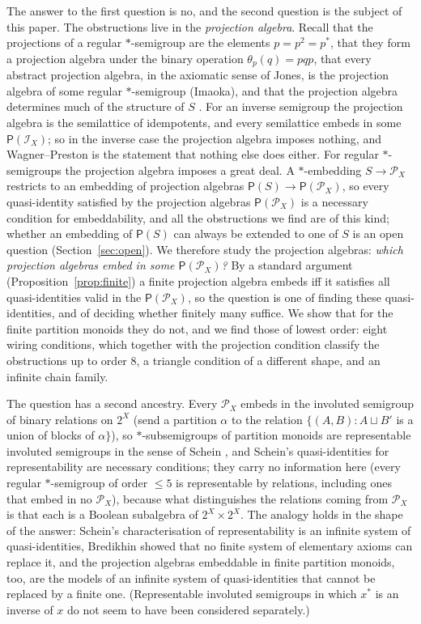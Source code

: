 \documentclass[11pt]{amsart}
\theoremstyle{definition}
\renewcommand{\P}{\mathcal{P}}      %
\newcommand{\PA}{\mathsf{P}}         %
\begin{document}
The answer to the first question is no, and the second question is the subject of this paper. The obstructions live in the \emph{projection algebra}. Recall that the projections of a regular $*$-semigroup are the elements $p=p^2=p^*$, that they form a projection algebra under the binary operation $\theta_p(q)=pqp$, that every abstract projection algebra, in the axiomatic sense of Jones, is the projection algebra of some regular $*$-semigroup (Imaoka), and that the projection algebra determines much of the structure of $S$ \cite{Imaoka80,Imaoka81,Jones,EM,EGMR}. For an inverse semigroup the projection algebra is the semilattice of idempotents, and every semilattice embeds in some $\PA(\mathcal I_X)$; so in the inverse case the projection algebra imposes nothing, and Wagner--Preston is the statement that nothing else does either. For regular $*$-semigroups the projection algebra imposes a great deal. A $*$-embedding $S\to\P_X$ restricts to an embedding of projection algebras $\PA(S)\to\PA(\P_X)$, so every quasi-identity satisfied by the projection algebras $\PA(\P_X)$ is a necessary condition for embeddability, and all the obstructions we find are of this kind; whether an embedding of $\PA(S)$ can always be extended to one of $S$ is an open question (Section~\ref{sec:open}). We therefore study the projection algebras: \emph{which projection algebras embed in some $\PA(\P_X)$?} By a standard argument (Proposition~\ref{prop:finite}) a finite projection algebra embeds iff it satisfies all quasi-identities valid in the $\PA(\P_X)$, so the question is one of finding these quasi-identities, and of deciding whether finitely many suffice. We show that for the finite partition monoids they do not, and we find those of lowest order: eight wiring conditions, which together with the projection condition classify the obstructions up to order $8$, a triangle condition of a different shape, and an infinite chain family.

The question has a second ancestry. Every $\P_X$ embeds in the involuted semigroup of binary relations on $2^X$ (send a partition $\alpha$ to the relation $\{(A,B): A\sqcup B'$ is a union of blocks of $\alpha\}$), so $*$-subsemigroups of partition monoids are representable involuted semigroups in the sense of Schein \cite{Schein}, and Schein's quasi-identities for representability are necessary conditions; they carry no information here (every regular $*$-semigroup of order $\le5$ is representable by relations, including ones that embed in no $\P_X$), because what distinguishes the relations coming from $\P_X$ is that each is a Boolean subalgebra of $2^X\times2^X$. The analogy holds in the shape of the answer: Schein's characterisation of representability is an infinite system of quasi-identities, Bredikhin \cite{Bredikhin} showed that no finite system of elementary axioms can replace it, and the projection algebras embeddable in finite partition monoids, too, are the models of an infinite system of quasi-identities that cannot be replaced by a finite one. (Representable involuted semigroups in which $x^*$ is an inverse of $x$ do not seem to have been considered separately.)
\end{document}

